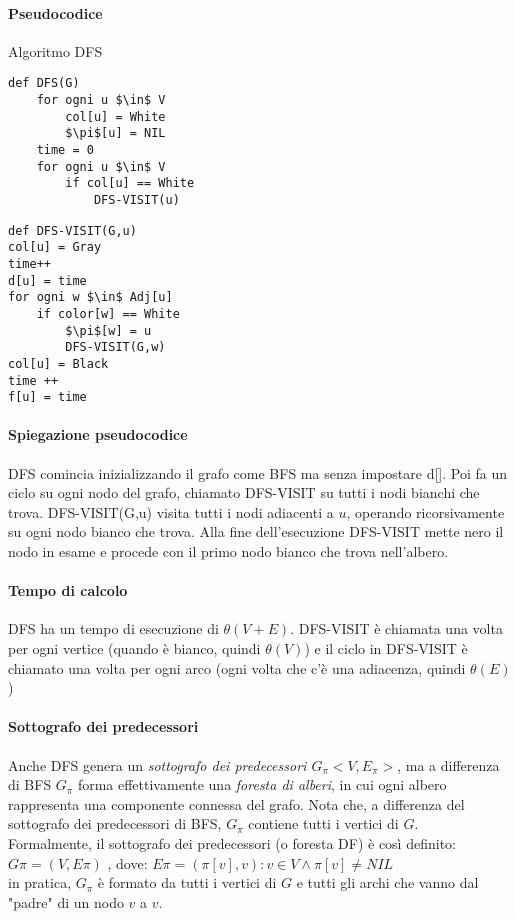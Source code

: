 \documentclass[12pt, a4paper, openany]{book}
\begin{document}
\paragraph{Pseudocodice} Algoritmo DFS
\begin{lstlisting}
def DFS(G)
    for ogni u $\in$ V
        col[u] = White
        $\pi$[u] = NIL
    time = 0
    for ogni u $\in$ V
        if col[u] == White
            DFS-VISIT(u)
\end{lstlisting}
\begin{lstlisting}
def DFS-VISIT(G,u)
col[u] = Gray
time++
d[u] = time
for ogni w $\in$ Adj[u]
    if color[w] == White
        $\pi$[w] = u
        DFS-VISIT(G,w)
col[u] = Black
time ++
f[u] = time    
\end{lstlisting}

\paragraph{Spiegazione pseudocodice}
DFS comincia inizializzando il grafo come BFS ma senza impostare d[].
Poi fa un ciclo su ogni nodo del grafo, chiamato DFS-VISIT su tutti i nodi bianchi che trova.
DFS-VISIT(G,u) visita tutti i nodi adiacenti a $u$, operando ricorsivamente su ogni nodo bianco che trova.
Alla fine dell'esecuzione DFS-VISIT mette nero il nodo in esame e procede con il primo nodo bianco che trova nell'albero.
\paragraph*{Tempo di calcolo}
DFS ha un tempo di esecuzione di $\theta(V+E)$.
DFS-VISIT è chiamata una volta per ogni vertice (quando è bianco, quindi $\theta(V)$)
e il ciclo in DFS-VISIT è chiamato una volta per ogni arco (ogni volta che c'è una adiacenza, quindi $\theta(E)$)

\paragraph{Sottografo dei predecessori}
Anche DFS genera un \emph{sottografo dei predecessori $G_\pi<V,E_\pi>$}, ma a differenza di BFS
$G_\pi$ forma effettivamente una \emph{foresta di alberi}, in cui ogni albero rappresenta una componente connessa del grafo.
Nota che, a differenza del sottografo dei predecessori di BFS, $G_\pi$ contiene tutti i vertici di $G$.
\\Formalmente, il sottografo dei predecessori (o foresta DF) è così definito:
$G\pi = (V, E\pi )$ , dove:
$E\pi = {(\pi[v], v) : v \in V \land \pi[v] \neq NIL}$
\\in pratica, $G_\pi$ è formato da tutti i vertici di $G$ e tutti gli archi che vanno dal "padre" di un nodo $v$ a $v$.
\end{document}
